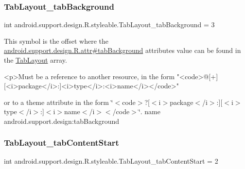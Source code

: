 \mbox{\label{classandroid_1_1support_1_1design_1_1R_1_1styleable_a520d2db5d68381c7d9477e52942fbdc4}} 
\subsubsection{\texorpdfstring{Tab\+Layout\+\_\+tab\+Background}{TabLayout\_tabBackground}}
{\footnotesize\ttfamily int android.\+support.\+design.\+R.\+styleable.\+Tab\+Layout\+\_\+tab\+Background = 3\hspace{0.3cm}{\ttfamily [static]}}

This symbol is the offset where the \hyperlink{classandroid_1_1support_1_1design_1_1R_1_1attr_a0d6b5d1f9567a7ffe9de602efc8133f4}{android.\+support.\+design.\+R.\+attr\#tab\+Background} attribute\textquotesingle{}s value can be found in the \hyperlink{classandroid_1_1support_1_1design_1_1R_1_1styleable_a514b47b47f600f9421b65f4f0aa832d6}{Tab\+Layout} array.

\begin{DoxyVerb}      <p>Must be a reference to another resource, in the form "<code>@[+][<i>package</i>:]<i>type</i>:<i>name</i></code>"
\end{DoxyVerb}
 or to a theme attribute in the form \char`\"{}$<$code$>$?\mbox{[}$<$i$>$package$<$/i$>$\+:\mbox{]}\mbox{[}$<$i$>$type$<$/i$>$\+:\mbox{]}$<$i$>$name$<$/i$>$$<$/code$>$\char`\"{}.  name android.\+support.\+design\+:tab\+Background \mbox{\label{classandroid_1_1support_1_1design_1_1R_1_1styleable_a45fca30d8fcae06a2922ea877aa726b2}} 
\subsubsection{\texorpdfstring{Tab\+Layout\+\_\+tab\+Content\+Start}{TabLayout\_tabContentStart}}
{\footnotesize\ttfamily int android.\+support.\+design.\+R.\+styleable.\+Tab\+Layout\+\_\+tab\+Content\+Start = 2\hspace{0.3cm}{\ttfamily [static]}}

